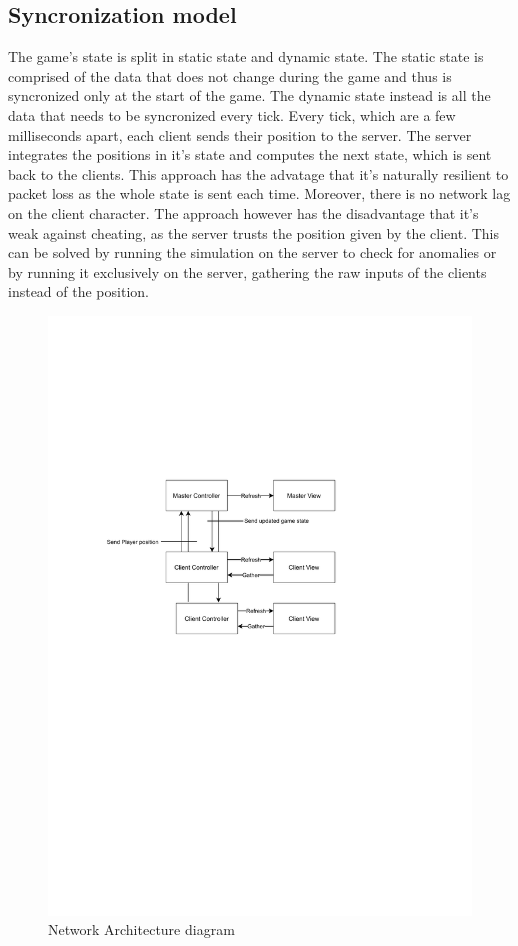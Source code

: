 \documentclass{article}
\begin{document}
\subsection{Syncronization model}
The game's state is split in static state and dynamic state. The static state is comprised of the data that does not change during the game and thus is syncronized only at the start of the game. The dynamic state instead is all the data that needs to be syncronized every tick. 
Every tick, which are a few milliseconds apart, each client sends their position to the server. The server integrates the positions in it's state and computes the next state, which is sent back to the clients.
 This approach has the advatage that it's naturally resilient to packet loss as the whole state is sent each time. Moreover, there is no network lag on the client character.
 The approach however has the disadvantage that it's weak against cheating, as the server trusts the position given by the client. This can be solved by running the simulation on the server to check for anomalies or by running it exclusively on the server, gathering the raw inputs of the clients instead of the position.
\smallskip
\begin{figure}[H]
\includegraphics[width=\textwidth]{net architecture}
\caption{Network Architecture diagram}
\end{figure}
\end{document}

